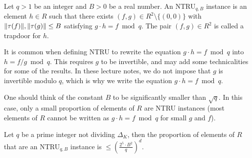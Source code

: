 \begin{definition}
Let $q >1$ be an integer and $B >0$ be a real number. An NTRU$_{q,B}$ instance is an element $h \in R$ such that there exists $(f,g) \in R^2\setminus \{(0,0)\}$ with $\|\tau(f)\|, \|\tau(g)\| \leq B$ satisfying $g \cdot h = f \bmod q$. The pair $(f,g) \in R^2$ is called a trapdoor for $h$.
\end{definition}

It is common when defining NTRU to rewrite the equation $g \cdot h = f \bmod q$ into $h = f/g \bmod q$. This requires $g$ to be invertible, and may add some technicalities for some of the results. In these lecture notes, we do not impose that $g$ is invertible modulo $q$, which is why we write the equation $g \cdot h = f \bmod q$.

One should think of the constant $B$ to be significantly smaller than $\sqrt{q}$. In this case, only a small proportion of elements of $R$ are NTRU instances (most elements of $R$ cannot be written as $g \cdot h = f \bmod q$ for small $g$ and $f$).

\begin{lemma}
Let $q$ be a prime integer not dividing $\Delta_K$, then the proportion of elements of $R$ that are an NTRU$_{q,B}$ instance is $\leq \left( \frac{2^5 \cdot B^2}{q}\right)^d$.
\end{lemma}

